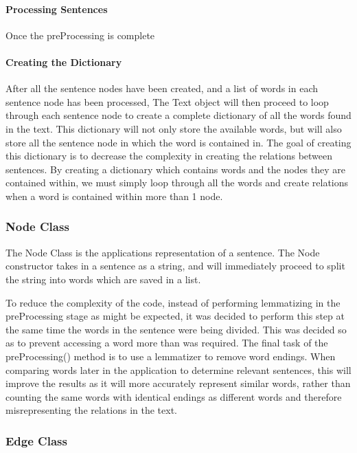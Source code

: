 	\paragraph{Processing Sentences}
		
		Once the preProcessing is complete
	
	\paragraph{Creating the Dictionary}
	
		After all the sentence nodes have been created, and a list of words in each sentence node has been processed, The Text object will then proceed to loop through each sentence node to create a complete dictionary of all the words found in the text. This dictionary will not only store the available words, but will also store all the sentence node in which the word is contained in. The goal of creating this dictionary is to decrease the complexity in creating the relations between sentences. By creating a dictionary which contains words and the nodes they are contained within, we must simply loop through all the words and create relations when a word is contained within more than 1 node.
		
	\paragraph{}
	
	\subsubsection{Node Class}
	
		The Node Class is the applications representation of a sentence. The Node constructor takes in a sentence as a string, and will immediately proceed to split the string into words which are saved in a list. 
		
		To reduce the complexity of the code, instead of performing lemmatizing in the preProcessing stage as might be expected, it was decided to perform this step at the same time the words in the sentence were being divided. This was decided so as to prevent accessing a word more than was required.
		The final task of the preProcessing() method is to use a lemmatizer to remove word endings. When comparing words later in the application to determine relevant sentences, this will improve the results as it will more accurately represent similar words, rather than counting the same words with identical endings as different words and therefore misrepresenting the relations in the text.
		
	
	\subsubsection{Edge Class}
	
	
	

